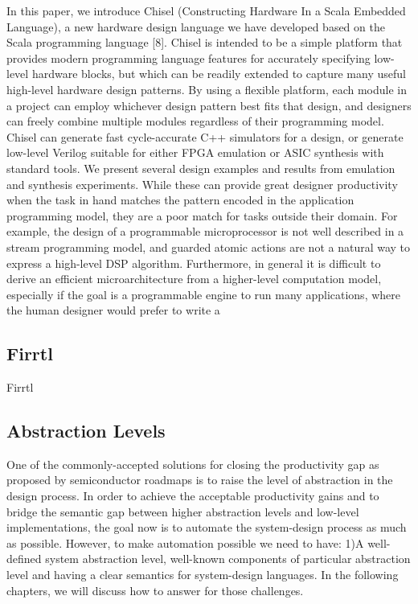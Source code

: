 In this paper, we introduce Chisel (Constructing Hardware In a Scala Embedded Language), a new hardware design language we have developed based on the Scala programming language [8]. Chisel is intended to be a simple
platform that provides modern programming language features for accurately specifying low-level hardware blocks,
but which can be readily extended to capture many useful high-level hardware design patterns. By using a flexible
platform, each module in a project can employ whichever
design pattern best fits that design, and designers can freely
combine multiple modules regardless of their programming
model. Chisel can generate fast cycle-accurate C++ simulators for a design, or generate low-level Verilog suitable for
either FPGA emulation or ASIC synthesis with standard
tools. We present several design examples and results from
emulation and synthesis experiments.
While these can provide great designer productivity when
the task in hand matches the pattern encoded in the application programming model, they are a poor match for tasks
outside their domain. For example, the design of a programmable microprocessor is not well described in a stream
programming model, and guarded atomic actions are not a
natural way to express a high-level DSP algorithm. Furthermore, in general it is difficult to derive an efficient microarchitecture from a higher-level computation model, especially
if the goal is a programmable engine to run many applications, where the human designer would prefer to write a

\subsection{Firrtl}
Firrtl~\cite{izraelevitz_2017_firrtl_reusability, firrtl}




\subsection{Abstraction Levels}

One of the commonly-accepted solutions for closing the productivity gap as
proposed by semiconductor roadmaps is to raise the level of abstraction in the design process. In order to achieve the acceptable productivity gains
and to bridge the semantic gap between higher abstraction levels and low-level
implementations, the goal now is to automate the system-design process as
much as possible. 
However, to make automation possible we need to have: 1)A well-defined system abstraction level, well-known components of particular abstraction level and having a clear semantics for system-design languages.
In the following chapters, we will discuss how to answer for those challenges.

